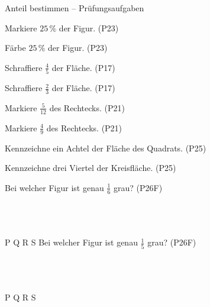 \begin{aufgabe}{Anteil bestimmen – Prüfungsaufgaben}
\begin{teile}
\teil Markiere $25\,\%$ der Figur. \hfill (P23)

\teil Färbe $25\,\%$ der Figur. \hfill (P23)

\teil Schraffiere $\frac{4}{5}$ der Fläche. \hfill (P17)

\teil Schraffiere $\frac{2}{3}$ der Fläche. \hfill (P17)

\teil Markiere $\frac{5}{12}$ des Rechtecks. \hfill (P21)

\teil Markiere $\frac{4}{9}$ des Rechtecks. \hfill (P21)

\teil Kennzeichne ein Achtel der Fläche des Quadrats. \hfill (P25)

\teil Kennzeichne drei Viertel der Kreisfläche. \hfill (P25)

\kreisleer[2]
\teil Bei welcher Figur ist genau $\frac{1}{6}$ grau? \hfill (P26F)\\ \\ \\ \\ 

P  \quad Q  \quad R  \quad S 
\teil Bei welcher Figur ist genau $\frac{1}{5}$ grau? \hfill (P26F)\\ \\ \\ \\ 

P  \quad Q  \quad R  \quad S 
\end{teile}
\end{aufgabe}

\medskip
{}
